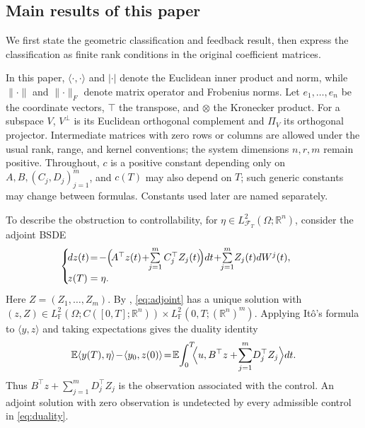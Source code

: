 \documentclass[twocolumn]{autart}
\begin{document}
 

\subsection{Main results of this paper}\label{sec:geometry}

We first state the geometric classification and feedback result, then express the classification as finite rank conditions in the original coefficient matrices.

In this paper, \(\langle\cdot,\cdot\rangle\) and \(|\cdot|\) denote the Euclidean inner product and norm, while \(\lVert\cdot\rVert\) and \(\lVert\cdot\rVert_F\) denote matrix operator and Frobenius norms. Let \(e_1,\dots,e_n\) be the coordinate vectors, \(\top\) the transpose, and \(\otimes\) the Kronecker product. For a subspace \(V\), \(V^\perp\) is its Euclidean orthogonal complement and \(\Pi_V\) its orthogonal projector. Intermediate matrices with zero rows or columns are allowed under the usual rank, range, and kernel conventions; the system dimensions \(n,r,m\) remain positive. Throughout, \(c\) is a positive constant depending only on \(A,B,(C_j,D_j)_{j=1}^m\), and \(c(T)\) may also depend on \(T\); such generic constants may change between formulas. Constants used later are named separately.



To describe the obstruction to controllability, for $\eta\in L^2_{\mathcal F_T}(\Omega;\mathbb R^n)$,
consider the adjoint BSDE\vspace{-2mm}
%
\begin{equation}\label{eq:adjoint}
\!\!\!\begin{cases}\!
dz(t)\! =\!-\Bigl(\!A^{\top}z(t)\!+\!\!\sum\limits_{j=1}^mC_j^{\top}Z_j(t)\!\Bigr) dt\! +\!\!\sum\limits_{j=1}^m\! Z_j(t) dW^j(t),\\[2pt]
\!z(T) =\eta.
\end{cases}\vspace{-1mm}
\end{equation}
%
Here $Z=(Z_1,\dots,Z_m)$. By \cite[Theorem~4.2]{Lue2021a},
\cref{eq:adjoint} has a unique solution with
$(z,Z)\in L^2_{\mathbb F}(\Omega;C([0,T];\mathbb R^n))\times L^2_{\mathbb F}(0,T;(\mathbb R^n)^m)$.
%
Applying It\^o's formula to $\langle y,z\rangle$ and taking expectations
gives the duality identity\vspace{-3mm}
%
\begin{equation}
\label{eq:duality}
\mathbb E\langle y(T),\eta\rangle \!-\! \langle y_0,z(0)\rangle \!=\!\mathbb E\!\int_0^T\!\!
\Bigl\langle u,B^{\top}z +\!\sum_{j=1}^m\!D_j^{\top}Z_j\Bigr\rangle dt.\vspace{-2mm}
\end{equation}
%
Thus $B^{\top}z+\sum\limits_{j=1}^mD_j^{\top}Z_j$ is the observation
associated with the control. An adjoint solution with zero observation is
undetected by every admissible control in \cref{eq:duality}.
\end{document}

